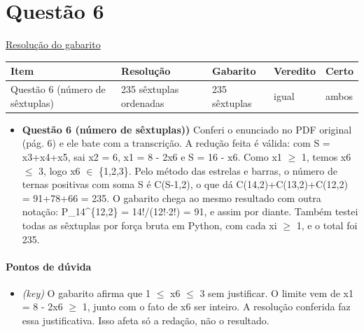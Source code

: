 \documentclass{article}%
\begin{document}
\section*{Questão 6}%
\href{https://poliedroresolve.sistemapoliedro.com.br/vestibulares/ita/2027/ita-2-fase-dia-1-20-10-2026-2-fase-dia-1/dissertativa-6-matematica-2-fase-dia-1-ita-2027}{Resolução do gabarito}\par\smallskip%
\begin{longtable}{@{}p{} p{} p{} p{} p{}@{}}\toprule Item & Resolução & Gabarito & Veredito & Certo \\ \midrule
Questão 6 (número de sêxtuplas) & 235 sêxtuplas ordenadas & 235 sêxtuplas & igual & ambos \\
\bottomrule\end{longtable}%
\begin{itemize}%
\item%
\textbf{Questão 6 (número de sêxtuplas))} Conferi o enunciado no PDF original (pág. 6) e ele bate com a transcrição. A redução feita é válida: com S = x3+x4+x5, sai x2 = 6, x1 = 8 - 2x6 e S = 16 - x6. Como x1 $\geq$ 1, temos x6 $\leq$ 3, logo x6 $\in$ \{1,2,3\}. Pelo método das estrelas e barras, o número de ternas positivas com soma S é C(S-1,2), o que dá C(14,2)+C(13,2)+C(12,2) = 91+78+66 = 235. O gabarito chega ao mesmo resultado com outra notação: P\_14\^{}\{12,2\} = 14!/(12!$\cdot$2!) = 91, e assim por diante. Também testei todas as sêxtuplas por força bruta em Python, com cada xi $\geq$ 1, e o total foi 235.%
\end{itemize}%
\paragraph{Pontos de dúvida}%
\begin{itemize}%
\item%
\textit{(key)} O gabarito afirma que 1 $\leq$ x6 $\leq$ 3 sem justificar. O limite vem de x1 = 8 - 2x6 $\geq$ 1, junto com o fato de x6 ser inteiro. A resolução conferida faz essa justificativa. Isso afeta só a redação, não o resultado.%
\end{itemize}%
\end{document}

